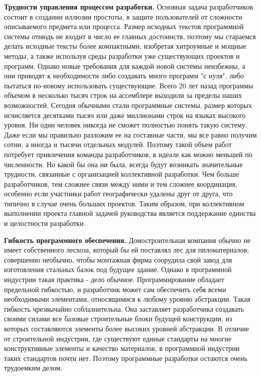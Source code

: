 \documentclass[a4paper,12pt]{article}
\begin{document}
\begin{small}
\textbf{Трудности управления процессом разработки.} Основная задача разработчиков состоит в создании иллюзии простоты, в защите пользователей от сложности описываемого предмета или процесса. Размер исходных текстов программной системы отнюдь не входит в число ее главных достоинств, поэтому мы стараемся делать исходные тексты более компактными, изобретая хитроумные и мощные методы, а также используя среды разработки уже существующих проектов и программ. Однако новые требования для каждой новой системы неизбежны, а они приводят к необходимости либо создавать много программ "с нуля", либо пытаться по-новому использовать существующие. Всего 20 лет назад программы объемом в несколько тысяч строк на ассемблере выходили за пределы наших возможностей. Сегодня обычными стали программные системы, размер которых исчисляется десятками тысяч или даже миллионами строк на языках высокого уровня. Ни один человек никогда не сможет полностью понять такую систему. Даже если мы правильно разложим ее на составные части, мы все равно получим сотни, а иногда и тысячи отдельных модулей. Поэтому такой объем работ потребует привлечения команды разработчиков, в идеале как можно меньшей по численности. Но какой бы она ни была, всегда будут возникать значительные трудности, связанные с организацией коллективной разработки. Чем больше разработчиков, тем сложнее связи между ними и тем сложнее координация, особенно если участники работ географически удалены друг от друга, что типично в случае очень больших проектов. Таким образом, при коллективном выполнении проекта главной задачей руководства является поддержание единства и целостности разработки. \par \medskip
\textbf{Гибкость программного обеспечения.} Домостроительная компания обычно не имеет собственного лесхоза, который бы ей поставлял лес для пиломатериалов; совершенно необычно, чтобы монтажная фирма соорудила свой завод для изготовления стальных балок под будущее здание. Однако в программной индустрии такая практика - дело обычное. Программирование обладает предельной гибкостью, и разработчик может сам обеспечить себя всеми необходимыми элементами, относящимися к любому уровню абстракции. Такая гибкость чрезвычайно соблазнительна. Она заставляет разработчика создавать своими силами все базовые строительные блоки будущей конструкции, из которых составляются элементы более высоких уровней абстракции. В отличие от строительной индустрии, где существуют единые стандарты на многие конструктивные элементы и качество материалов, в программной индустрии таких стандартов почти нет. Поэтому программные разработки остаются очень трудоемким делом.\par \medskip

\end{small}
\end{document}
